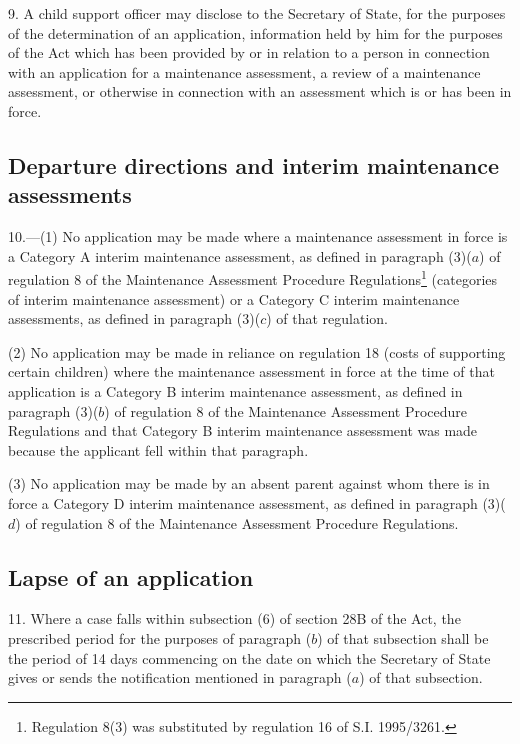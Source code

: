 \documentclass[a4paper]{article}
\begin{document}
9.  A child support officer may disclose to the Secretary of State, for the purposes of the determination of an application, information held by him for the purposes of the Act which has been provided by or in relation to a person in connection with an application for a maintenance assessment, a review of a maintenance assessment, or otherwise in connection with an assessment which is or has been in force.

\subsection[10. Departure directions and interim maintenance assessments]{Departure directions and interim maintenance assessments}

10.—(1) No application may be made where a maintenance assessment in force is a Category A interim maintenance assessment, as defined in paragraph (3)($a$) of regulation 8 of the Maintenance Assessment Procedure Regulations\footnote{\frenchspacing Regulation 8(3) was substituted by regulation 16 of S.I. 1995/3261.} (categories of interim maintenance assessment) or a Category C interim maintenance assessments, as defined in paragraph (3)($c$) of that regulation.

(2) No application may be made in reliance on regulation 18 (costs of supporting certain children) where the maintenance assessment in force at the time of that application is a Category B interim maintenance assessment, as defined in paragraph (3)($b$) of regulation 8 of the Maintenance Assessment Procedure Regulations and that Category B interim maintenance assessment was made because the applicant fell within that paragraph.

(3) No application may be made by an absent parent against whom there is in force a Category D interim maintenance assessment, as defined in paragraph (3)($d$) of regulation 8 of the Maintenance Assessment Procedure Regulations.

\subsection[11. Lapse of an application]{Lapse of an application}

11.  Where a case falls within subsection (6) of section 28B of the Act, the prescribed period for the purposes of paragraph ($b$) of that subsection shall be the period of 14 days commencing on the date on which the Secretary of State gives or sends the notification mentioned in paragraph ($a$) of that subsection.
\end{document}
